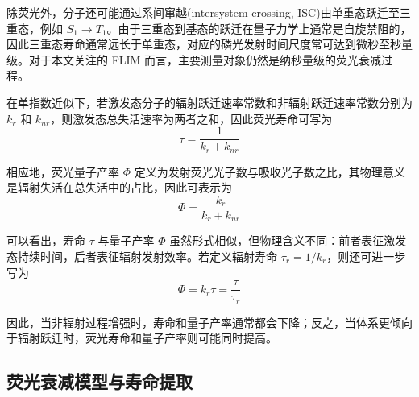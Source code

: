 除荧光外，分子还可能通过系间窜越(intersystem crossing, ISC)由单重态跃迁至三重态，例如 $S_1 \rightarrow T_1$。由于三重态到基态的跃迁在量子力学上通常是自旋禁阻的，因此三重态寿命通常远长于单重态，对应的磷光发射时间尺度常可达到微秒至秒量级。对于本文关注的 FLIM 而言，主要测量对象仍然是纳秒量级的荧光衰减过程。

在单指数近似下，若激发态分子的辐射跃迁速率常数和非辐射跃迁速率常数分别为 $k_r$ 和 $k_{nr}$，则激发态总失活速率为两者之和，因此荧光寿命可写为
\begin{equation}
  \tau=\frac{1}{k_r+k_{nr}}
\end{equation}

相应地，荧光量子产率 $\Phi$ 定义为发射荧光光子数与吸收光子数之比，其物理意义是辐射失活在总失活中的占比，因此可表示为
\begin{equation}
  \Phi=\frac{k_r}{k_r+k_{nr}}
\end{equation}

可以看出，寿命 $\tau$ 与量子产率 $\Phi$ 虽然形式相似，但物理含义不同：前者表征激发态持续时间，后者表征辐射发射效率。若定义辐射寿命 $\tau_r=1/k_r$，则还可进一步写为
\begin{equation}
  \Phi = k_r\tau=\frac{\tau}{\tau_r}
\end{equation}

因此，当非辐射过程增强时，寿命和量子产率通常都会下降；反之，当体系更倾向于辐射跃迁时，荧光寿命和量子产率则可能同时提高。



\subsection{荧光衰减模型与寿命提取}\label{5.1.2}

